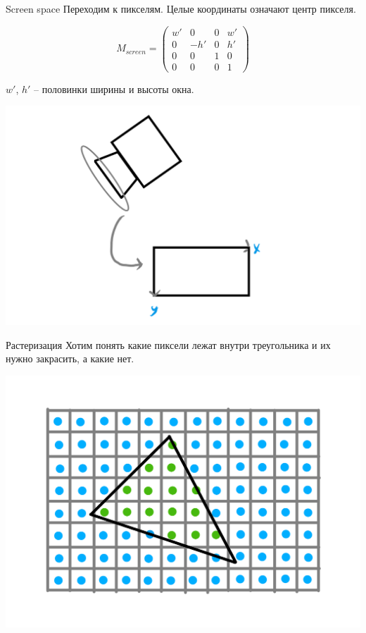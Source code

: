 \documentclass{beamer}
\begin{document}
\begin{frame}{Screen space}
    Переходим к пикселям. Целые координаты означают центр 
    пикселя. 
    
    \[
        M_{screen} = 
        \begin{pmatrix}
            w' & 0 & 0 & w'\\
            0 & -h' & 0 & h'\\
            0 & 0 & 1 & 0\\
            0 & 0 & 0 & 1
        \end{pmatrix}
    \]

    $w'$, $h'$ -- половинки ширины и высоты окна.

\begin{center}
\includegraphics[width=0.6 \linewidth]{screen.png}
\end{center}
\end{frame}

\begin{frame}{Растеризация}
    Хотим понять какие пиксели лежат внутри треугольника и их нужно 
    закрасить, а какие нет.
\begin{center}
\includegraphics[width=0.8 \linewidth]{rasterization.png}
\end{center}
\end{frame}
\end{document}
